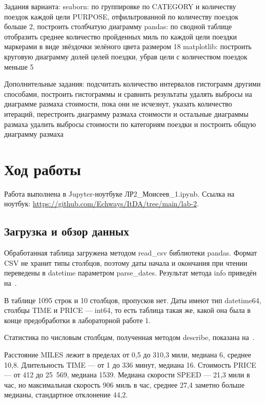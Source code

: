 \documentclass[a4paper,14pt]{extarticle}
\begin{document}
Задания варианта:
\suainum
seaborn: по группировке по CATEGORY и количеству поездок каждой цели PURPOSE, отфильтрованной по количеству поездок больше 2, построить столбчатую диаграмму
pandas: по сводной таблице отобразить среднее количество пройденных миль по каждой цели поездки маркерами в виде звёздочки зелёного цвета размером 18
matplotlib: построить круговую диаграмму долей целей поездки, убрав цели с количеством поездок меньше 5

Дополнительные задания:
\suainum
подсчитать количество интервалов гистограмм другими способами, построить гистограммы и сравнить результаты
удалять выбросы на диаграмме размаха стоимости, пока они не исчезнут, указать количество итераций, перестроить диаграмму размаха стоимости и остальные диаграммы размаха
удалить выбросы стоимости по категориям поездки и построить общую диаграмму размаха

\section{Ход работы}

Работа выполнена в Jupyter-ноутбуке ЛР2\_Моисеев\_1.ipynb. Ссылка на ноутбук: \url{https://github.com/Echways/ItDA/tree/main/lab-2}.

\subsection{Загрузка и обзор данных}

Обработанная таблица загружена методом read\_csv библиотеки pandas. Формат CSV не хранит типы столбцов, поэтому даты начала и окончания при чтении переведены в datetime параметром parse\_dates. Результат метода info приведён на~.


В таблице 1095 строк и 10 столбцов, пропусков нет. Даты имеют тип datetime64, столбцы TIME и PRICE — int64, то есть таблица такая же, какой она была в конце предобработки в лабораторной работе 1.

Статистика по числовым столбцам, полученная методом describe, показана на~.


Расстояние MILES лежит в пределах от 0,5 до 310,3 мили, медиана 6, среднее 10,8. Длительность TIME — от 1 до 336 минут, медиана 16. Стоимость PRICE — от 412 до 25~569, медиана 1539. Медиана скорости SPEED — 21,3 мили в час, но максимальная скорость 906 миль в час, среднее 27,4 заметно больше медианы, стандартное отклонение 44,2.
\end{document}
